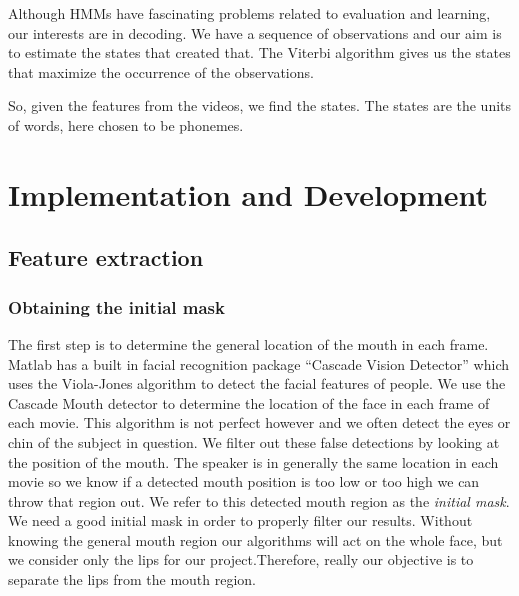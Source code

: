 \documentclass[a4paper,11pt]{article}
\begin{document}
Although HMMs have fascinating problems related to evaluation and learning, our interests are in decoding. We have a sequence of observations and our aim is to estimate the states that created that. The Viterbi algorithm \cite{key-3} gives us the states that maximize the occurrence of the observations. 

So, given the features from the videos, we find the states. The states are the units of words, here chosen to be phonemes. 
\section{Implementation and Development}

\subsection{Feature extraction}

\subsubsection{Obtaining the initial mask}
The first step is to determine the general location of the mouth in each frame. Matlab has a built in facial recognition package ``Cascade Vision Detector'' which uses the Viola-Jones algorithm to detect the facial features of people. We use the Cascade Mouth detector to determine the location of the face in each frame of each movie. This algorithm is not perfect however and we often detect the eyes or chin of the subject in question. We filter out these false detections by looking at the position of the mouth. The speaker is in generally the same location in each movie so we know if a detected mouth position is too low or too high we can throw that region out. We refer to this detected mouth region as the \textit{initial mask}. We need a good initial mask in order to properly filter our results. Without knowing the general mouth region our algorithms will act on the whole face, but we consider only the lips for our project.Therefore, really our objective is to separate the lips from the mouth region.\par
\end{document}
